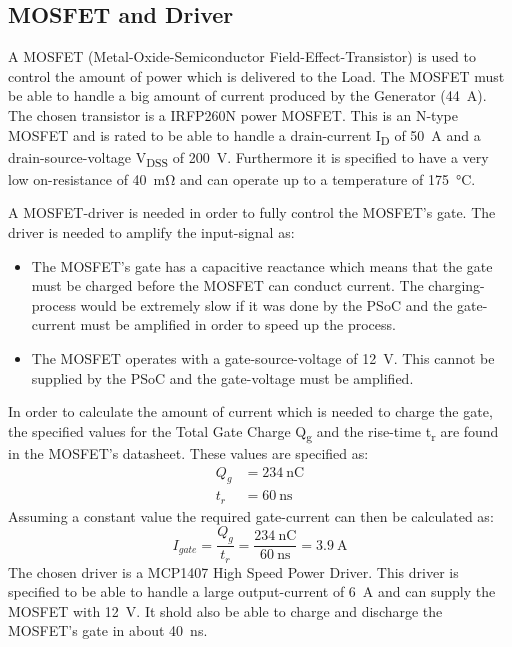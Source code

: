 \subsection{MOSFET and Driver}
A MOSFET (Metal-Oxide-Semiconductor Field-Effect-Transistor) is used to control the amount of power which is delivered to the Load. The MOSFET must be able to handle a big amount of current produced by the Generator (\SI{44}{\ampere}). The chosen transistor is a IRFP260N power MOSFET. This is an N-type MOSFET and is rated to be able to handle a drain-current I\textsubscript{D} of \SI{50}{\ampere} and a drain-source-voltage V\textsubscript{DSS} of \SI{200}{\volt}. Furthermore it is specified to have a very low on-resistance of \SI{40}{\milli \ohm} and can operate up to a temperature of \SI{175}{\celsius}.

A MOSFET-driver is needed in order to fully control the MOSFET's gate. The driver is needed to amplify the input-signal as:
\begin{itemize}
	\item The MOSFET's gate has a capacitive reactance which means that the gate must be charged before the MOSFET can conduct current. The charging-process would be extremely slow if it was done by the PSoC and the gate-current must be amplified in order to speed up the process.
	\item The MOSFET operates with a gate-source-voltage of \SI{12}{\volt}. This cannot be supplied by the PSoC and the gate-voltage must be amplified. 
\end{itemize}

In order to calculate the amount of current which is needed to charge the gate, the specified values for the Total Gate Charge Q\textsubscript{g} and the rise-time t\textsubscript{r} are found in the MOSFET's datasheet. These values are specified as:
\begin{equation}
\begin{split}
	Q_g &= \SI{234}{\nano \coulomb}\\
	t_r &= \SI{60}{\nano \second}
\end{split}
\end{equation}
Assuming a constant value the required gate-current can then be calculated as:
\begin{equation}
	I_{gate} = \frac{Q_g}{t_r} = \frac{\SI{234}{\nano \coulomb}}{\SI{60}{\nano \second}} = \SI{3.9}{\ampere}
\end{equation}
The chosen driver is a MCP1407 High Speed Power Driver. This driver is specified to be able to handle a large output-current of \SI{6}{\ampere} and can supply the MOSFET with \SI{12}{\volt}. It shold also be able to charge and discharge the MOSFET's gate in about \SI{40}{\nano \second}.

